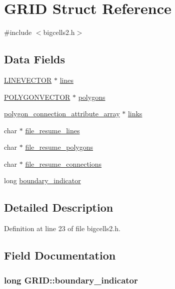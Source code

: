\hypertarget{struct_g_r_i_d}{\section{G\-R\-I\-D Struct Reference}
\label{struct_g_r_i_d}
}


{\ttfamily \#include $<$bigcells2.\-h$>$}

\subsection*{Data Fields}
\begin{DoxyCompactItemize}
\item 
\hyperlink{struct_l_i_n_e_v_e_c_t_o_r}{L\-I\-N\-E\-V\-E\-C\-T\-O\-R} $\ast$ \hyperlink{struct_g_r_i_d_a65a058e32255633bf023ba3de077dec4}{lines}
\item 
\hyperlink{struct_p_o_l_y_g_o_n_v_e_c_t_o_r}{P\-O\-L\-Y\-G\-O\-N\-V\-E\-C\-T\-O\-R} $\ast$ \hyperlink{struct_g_r_i_d_a91320dc03eda3245c1097ff5e89612c2}{polygons}
\item 
\hyperlink{structpolygon__connection__attribute__array}{polygon\-\_\-connection\-\_\-attribute\-\_\-array} $\ast$ \hyperlink{struct_g_r_i_d_a591d9702b42d9fd3d247a964574db173}{links}
\item 
char $\ast$ \hyperlink{struct_g_r_i_d_a572c9ae44fb8f35a751c5bd8d70b830f}{file\-\_\-resume\-\_\-lines}
\item 
char $\ast$ \hyperlink{struct_g_r_i_d_a4246eeca1c9ca68c5f7254c36551f6d7}{file\-\_\-resume\-\_\-polygons}
\item 
char $\ast$ \hyperlink{struct_g_r_i_d_a2b9e00a1b98c6b6761e4d6c7b5e44844}{file\-\_\-resume\-\_\-connections}
\item 
long \hyperlink{struct_g_r_i_d_a24faf774c2ae2c89f33ca5bb592f60fc}{boundary\-\_\-indicator}
\end{DoxyCompactItemize}


\subsection{Detailed Description}


Definition at line 23 of file bigcells2.\-h.



\subsection{Field Documentation}
\hypertarget{struct_g_r_i_d_a24faf774c2ae2c89f33ca5bb592f60fc}{
\subsubsection[{boundary\-\_\-indicator}]{\setlength{\rightskip}{0pt plus 5cm}long G\-R\-I\-D\-::boundary\-\_\-indicator}}\label{struct_g_r_i_d_a24faf774c2ae2c89f33ca5bb592f60fc}


